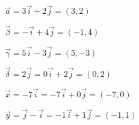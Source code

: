 \begin{alist}
\item $\vec{a}=3\vec{i}+2\vec{j}=(3,2)$
\item $\vec{\beta}=-\vec{i}+4\vec{j}=(-1,4)$
\item $\vec{\gamma}=5\vec{i}-3\vec{j}=(5,-3)$
\item $\vec{\delta}=2\vec{j}=0\vec{i}+2\vec{j}=(0,2)$
\item $\vec{x}=-7\vec{i}=-7\vec{i}+0\vec{j}=(-7,0)$
\item $\vec{y}=\vec{j}-\vec{i}=-1\vec{i}+1\vec{j}=(-1,1)$
\end{alist}
